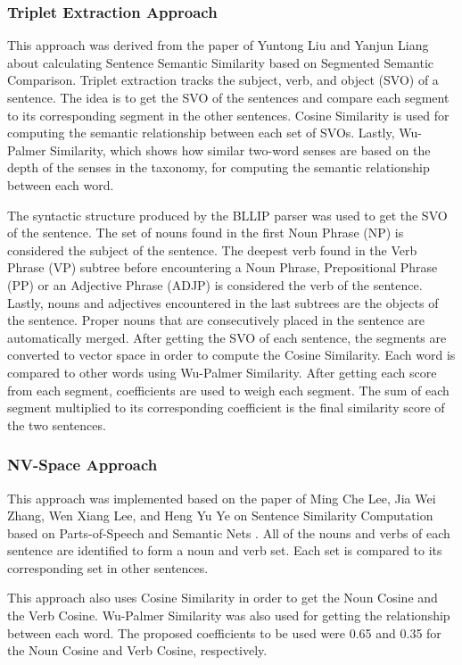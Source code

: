 \documentclass[journal]{./IEEEtran}
\begin{document}
	\subsubsection{Triplet Extraction Approach}
	
	This approach was derived from the paper of Yuntong Liu and Yanjun Liang about calculating Sentence Semantic Similarity based on Segmented Semantic Comparison\cite{yuntong13}. Triplet extraction tracks the subject, verb, and object (SVO) of a sentence. The idea is to get the SVO of the sentences and compare each segment to its corresponding segment in the other sentences. Cosine Similarity is used for computing the semantic relationship between each set of SVOs. Lastly, Wu-Palmer Similarity, which shows how similar two-word senses are based on the depth of the senses in the taxonomy, for computing the semantic relationship between each word.
	
	The syntactic structure produced by the BLLIP parser was used to get the SVO of the sentence. The set of nouns found in the first Noun Phrase (NP) is considered the subject of the sentence. The deepest verb found in the Verb Phrase (VP) subtree before encountering a Noun Phrase, Prepositional Phrase (PP) or an Adjective Phrase (ADJP) is considered the verb of the sentence. Lastly, nouns and adjectives encountered in the last subtrees are the objects of the sentence. Proper nouns that are consecutively placed in the sentence are automatically merged. After getting the SVO of each sentence, the segments are converted to vector space in order to compute the Cosine Similarity. Each word is compared to other words using Wu-Palmer Similarity. After getting each score from each segment, coefficients are used to weigh each segment. The sum of each segment multiplied to its corresponding coefficient is the final similarity score of the two sentences.
	
	\subsubsection{NV-Space Approach}
	This approach was implemented based on the paper of Ming Che Lee, Jia Wei Zhang, Wen Xiang Lee, and Heng Yu Ye on Sentence Similarity Computation based on Parts-of-Speech and Semantic Nets \cite{lee09}. All of the nouns and verbs of each sentence are identified to form a noun and verb set. Each set is compared to its corresponding set in other sentences.
	
	This approach also uses Cosine Similarity in order to get the Noun Cosine and the Verb Cosine. Wu-Palmer Similarity was also used for getting the relationship between each word. The proposed coefficients to be used were 0.65 and 0.35 for the Noun Cosine and Verb Cosine, respectively.
	
\end{document}
